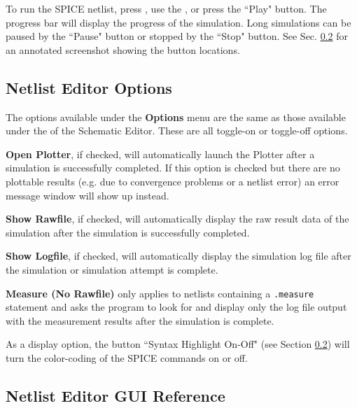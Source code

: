 To run the SPICE netlist, press , use the , or press the ``Play" button.  The progress bar will display the progress of the simulation.  Long simulations can be paused by the ``Pause" button or stopped by the ``Stop" button.  See Sec. \ref{subsec_pane_netlisteditorguireference} for an annotated screenshot showing the button locations.

\subsection{Netlist Editor Options}
\label{subsec_pane_netlisteditoroptions}

The options available under the \textsf{\textbf{Options}} menu are the same as those available under the  of the Schematic Editor.  These are all toggle-on or toggle-off options.  

\textsf{\textbf{Open Plotter}}, if checked, will automatically launch the Plotter after a simulation is successfully completed.  If this option is checked but there are no plottable results (e.g. due to convergence problems or a netlist error) an error message window will show up instead.

\textsf{\textbf{Show Rawfile}}, if checked, will automatically display the raw result data of the simulation after the simulation is successfully completed.

\textsf{\textbf{Show Logfile}}, if checked, will automatically display the simulation log file after the simulation or simulation attempt is complete.

\textsf{\textbf{Measure (No Rawfile)}} only applies to netlists containing a \texttt{.measure} statement and asks the program to look for and display only the log file output with the measurement results after the simulation is complete.

As a display option, the button ``Syntax Highlight On-Off" (see Section \ref{subsec_pane_netlisteditorguireference}) will turn the color-coding of the SPICE commands on or off.

\subsection{Netlist Editor GUI Reference}
\label{subsec_pane_netlisteditorguireference}

